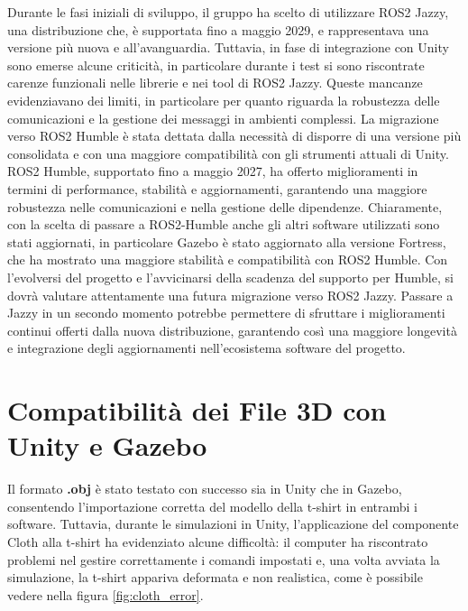 \documentclass[11pt]{report}
\begin{document}
Durante le fasi iniziali di sviluppo, il gruppo ha scelto di utilizzare ROS2 Jazzy, una distribuzione che, è supportata fino a maggio 2029, e rappresentava una versione più nuova e all’avanguardia. Tuttavia, in fase di integrazione con Unity sono emerse alcune criticità, in particolare durante i test si sono riscontrate carenze funzionali nelle librerie e nei tool di ROS2 Jazzy. Queste mancanze evidenziavano dei limiti, in particolare per quanto riguarda la robustezza delle comunicazioni e la gestione dei messaggi in ambienti complessi.
\newline
La migrazione verso ROS2 Humble è stata dettata dalla necessità di disporre di una versione più consolidata e con una maggiore compatibilità con gli strumenti attuali di Unity. ROS2 Humble, supportato fino a maggio 2027, ha offerto miglioramenti in termini di performance, stabilità e aggiornamenti, garantendo una maggiore robustezza nelle comunicazioni e nella gestione delle dipendenze. \cite{Supporto-versioni-ROS}
\newline
Chiaramente, con la scelta di passare a ROS2-Humble anche gli altri software utilizzati sono stati aggiornati, in particolare Gazebo è stato aggiornato alla versione Fortress, che ha mostrato una maggiore stabilità e compatibilità con ROS2 Humble. \cite{Gazebo-ROS2}
\newline
Con l’evolversi del progetto e l’avvicinarsi della scadenza del supporto per Humble, si dovrà valutare attentamente una futura migrazione verso ROS2 Jazzy. Passare a Jazzy in un secondo momento potrebbe permettere di sfruttare i miglioramenti continui offerti dalla nuova distribuzione, garantendo così una maggiore longevità e integrazione degli aggiornamenti nell’ecosistema software del progetto.
\section{Compatibilità dei File 3D con Unity e Gazebo}
\label{sec:Problemi_Compatibilità_3D}
Il formato \textbf{.obj} è stato testato con successo sia in Unity che in Gazebo, consentendo l'importazione corretta del modello della t-shirt in entrambi i software. Tuttavia, durante le simulazioni in Unity, l'applicazione del componente Cloth alla t-shirt ha evidenziato alcune difficoltà: il computer ha riscontrato problemi nel gestire correttamente i comandi impostati e, una volta avviata la simulazione, la t-shirt appariva deformata e non realistica, come è possibile vedere nella figura \ref{fig:cloth_error}.
\end{document}
